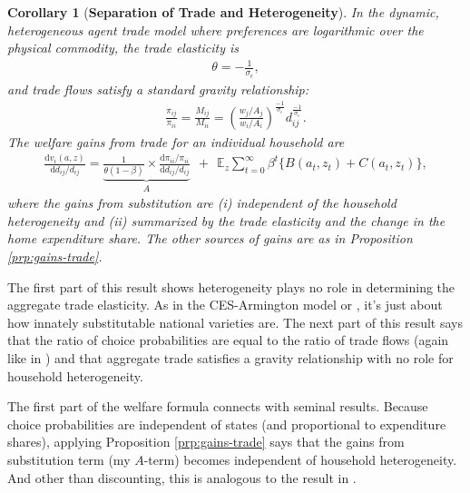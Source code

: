 \documentclass[12pt,pdftex]{article}
\newtheorem{corr}{Corollary}
\begin{document}
\begin{onehalfspacing}
\begin{corr}[\textbf{Separation of Trade and Heterogeneity}]\label{prp:seperation} In the dynamic, heterogeneous agent trade model where preferences are logarithmic over the physical commodity, the trade elasticity is
\begin{align}
\theta = -\frac{1}{\sigma_{\epsilon}}, \nonumber
\end{align}
and trade flows satisfy a standard gravity relationship:
\begin{align}
\frac{\pi_{ij}}{\pi_{ii}} = \frac{M_{ij}}{M_{ii}} = \left( \frac{  w_{j} / A_{j} }{  w_{i} / A_{i} } \right)^{\frac{-1}{\sigma_{\epsilon}}} d_{ij}^{\frac{-1}{\sigma_{\epsilon}}}. \nonumber
\end{align}
The welfare gains from trade for an individual household are
\begin{align}
\nonumber
\frac{\mathrm{d} v_i(a, z)}{\mathrm{d} d_{ij} / d_{ij}} = \underbrace{\frac{1}{\theta (1-\beta)} \times \frac{\mathrm{d} \pi_{ii} / \pi_{ii}}{\mathrm{d}d_{ij} / d_{ij}}}_{A} \ \ + \ \
\mathbb{E}_{z} \sum_{t = 0}^{\infty} \beta^{t} \bigg \{ B(a_{t},z_{t}) + C(a_{t},z_{t}) \bigg \},
\end{align}
where the gains from substitution are (i) independent of the household heterogeneity and (ii) summarized by the trade elasticity and the change in the home expenditure share. The other sources of gains are as in Proposition \ref{prp:gains-trade}.
\end{corr}
The first part of this result shows heterogeneity plays no role in determining the aggregate trade elasticity. As in the CES-Armington model or \citet{eaton2002technology}, it's just about how innately substitutable national varieties are. The next part of this result says that the ratio of choice probabilities are equal to the ratio of trade flows (again like in \citet{eaton2002technology}) and that aggregate trade satisfies a gravity relationship with no role for household heterogeneity.

The first part of the welfare formula connects with seminal results. Because choice probabilities are independent of states (and proportional to expenditure shares), applying Proposition \ref{prp:gains-trade} says that the gains from substitution term (my $A$-term) becomes independent of household heterogeneity. And other than discounting, this is analogous to the result in \citet{arkolakis2012new}.


\end{onehalfspacing}
\end{document}
